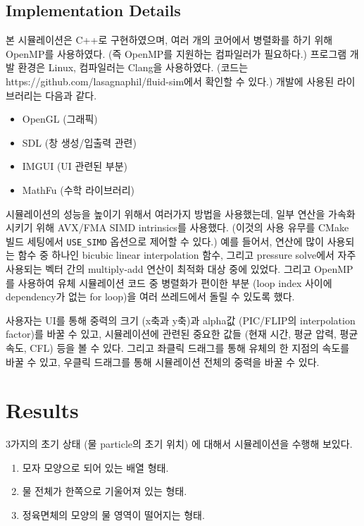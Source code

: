 \documentclass[10pt, A4]{article}
\begin{document}
\subsection{Implementation Details}

본 시뮬레이션은 C++로 구현하였으며, 여러 개의 코어에서 병렬화를 하기 위해 OpenMP를 사용하였다. (즉 OpenMP를 지원하는 컴파일러가 필요하다.) 프로그램 개발 환경은 Linux, 컴파일러는 Clang을 사용하였다. (코드는 https://github.com/lasagnaphil/fluid-sim에서 확인할 수 있다.) 개발에 사용된 라이브러리는 다음과 같다.

\begin{itemize}
  \item OpenGL (그래픽)
  \item SDL (창 생성/입출력 관련)
  \item IMGUI (UI 관련된 부분)
  \item MathFu (수학 라이브러리)
\end{itemize}

시뮬레이션의 성능을 높이기 위해서 여러가지 방법을 사용했는데, 일부 연산을 가속화시키기 위해 AVX/FMA SIMD intrinsics를 사용했다. (이것의 사용 유무를 CMake 빌드 세팅에서 \texttt{USE\_SIMD} 옵션으로 제어할 수 있다.) 예를 들어서, 연산에 많이 사용되는 함수 중 하나인 bicubic linear interpolation 함수, 그리고 pressure solve에서 자주 사용되는 벡터 간의 multiply-add 연산이 최적화 대상 중에 있었다.  그리고 OpenMP를 사용하여 유체 시뮬레이션 코드 중 병렬화가 편이한 부분 (loop index 사이에 dependency가 없는 for loop)을 여러 쓰레드에서 돌릴 수 있도록 했다.

사용자는 UI를 통해 중력의 크기 (x축과 y축)과 alpha값 (PIC/FLIP의 interpolation factor)를 바꿀 수 있고, 시뮬레이션에 관련된 중요한 값들 (현재 시간, 평균 압력, 평균 속도, CFL) 등을 볼 수 있다. 그리고 좌클릭 드래그를 통해 유체의 한 지점의 속도를 바꿀 수 있고, 우클릭 드래그를 통해 시뮬레이션 전체의 중력을 바꿀 수 있다.

\section{Results}

3가지의 초기 상태 (물 particle의 초기 위치) 에 대해서 시뮬레이션을 수행해 보있다.

\begin{enumerate}[label=\Alph*.]
  \item 모자 모양으로 되어 있는 배열 형태.
  \item 물 전체가 한쪽으로 기울어져 있는 형태.
  \item 정육면체의 모양의 물 영역이 떨어지는 형태.
\end{enumerate}
\end{document}
